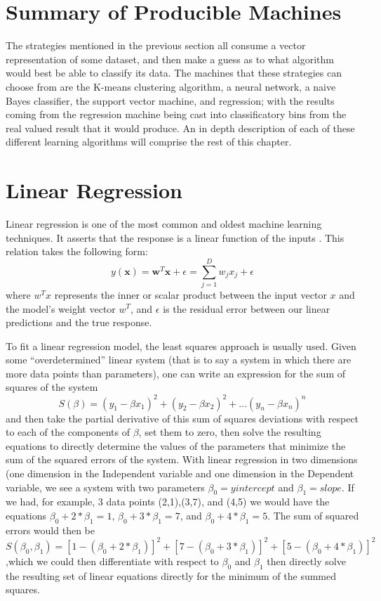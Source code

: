 \section{Summary of Producible Machines}
The strategies mentioned in the previous section all consume a vector
representation of some dataset, and then make a guess as to what algorithm would best
be able to classify its data. The machines that these strategies can choose from are
the K-means clustering algorithm, a neural network, a naive Bayes classifier, the support
vector machine, and regression; with the results coming from the regression
machine being cast into classificatory bins from the real valued result that it
would produce. An in depth description of each of these different learning
algorithms will comprise the rest of this chapter.
\section{Linear Regression}
Linear regression is one of the most common and oldest machine learning
techniques. It asserts that the response is a linear function
of the inputs \cite{Murphy}. This relation takes the following form:
$$ y(\textbf{x}) = \textbf{w}^T\textbf{x} + \epsilon = \sum_{j=1}^{D}w_jx_j + \epsilon $$
where $w^Tx$ represents the inner or scalar product between the input vector $x$
and the model's weight vector $w^T$, and $\epsilon$ is the residual error
between our linear predictions and the true response.

To fit a linear regression model, the least squares approach is usually used.
Given some  ``overdetermined'' linear system (that is to say a system in which
there are more data points than parameters), one can write an expression for the
sum of squares of the system
$$S(\beta) = (y_1 - \beta x_1)^2 + (y_2 - \beta x_2)^2 + ... (y_n - \beta x_n)^n$$
and then take the partial derivative of this sum of squares deviations with respect
to each of the components of $\beta$, set them to zero, then solve the resulting
equations to directly determine the values of the parameters that
minimize the sum of the squared errors of the system. With linear regression in
two dimensions (one dimension in the Independent variable and one dimension in
the Dependent variable, we see a system with two parameters
$\beta_0 = y intercept$ and $\beta_1 = slope$. If we had, for example, 3 data
points (2,1),(3,7), and (4,5) we would have the equations
$\beta_0 + 2*\beta_1 = 1$, $\beta_0 + 3*\beta_1 = 7$, and
$\beta_0 + 4*\beta_1 = 5$. The sum of squared errors would then be
 $S(\beta_0,\beta_1)= [1 - (\beta_0 + 2*\beta_1)]^2 + [7 - (\beta_0 + 3*\beta_1)]^2 + [5 - (\beta_0 + 4*\beta_1)]^2$
,which we could then differentiate with respect to $\beta_0$ and $\beta_1$ then
directly solve the resulting set of linear equations directly for the minimum of
the summed squares.
